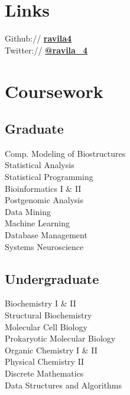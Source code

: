 \documentclass[]{deedy-resume-openfont}
\begin{document}
\newpage

\begin{minipage}[t]{0.33\textwidth} 


\section{Links} 
Github:// \href{https://github.com/ravila4}{\bf ravila4}\\
Twitter://  \href{https://twitter.com/ravila_4}{\bf @ravila\_4}\\
\sectionsep


\section{Coursework}
\subsection{Graduate}
Comp. Modeling of Biostructures\\
Statistical Analysis \\
Statistical Programming \\
Bioinformatics I \& II \\
Postgenomic Analysis\\
Data Mining \\
Machine Learning \\
Database Management\\
Systems Neuroscience\\
\sectionsep

\subsection{Undergraduate}
Biochemistry I \& II \\
Structural Biochemistry\\
Molecular Cell Biology \\
Prokaryotic Molecular Biology \\
Organic Chemistry I \& II \\
Physical Chemistry II \\
Discrete Mathematics \\
Data Structures and Algorithms\\
\sectionsep


\end{minipage}
\end{document}
